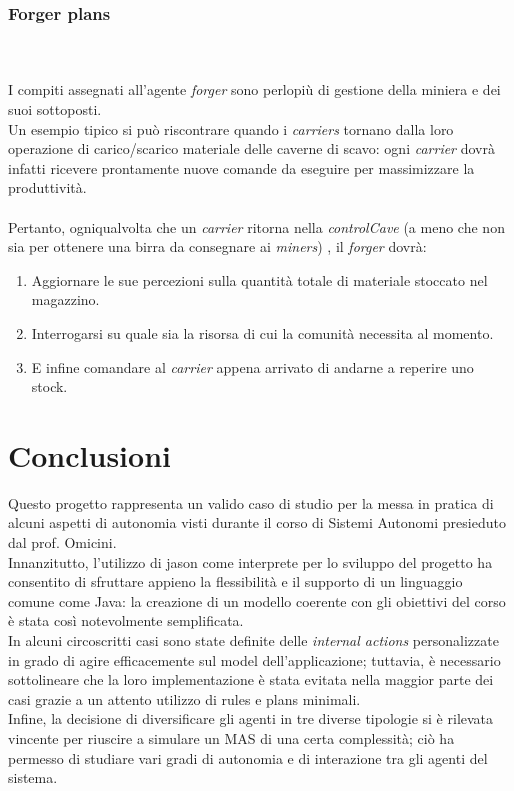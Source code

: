 \documentclass{llncs}
\begin{document}
\subsubsection{Forger plans}~\\\\
I compiti assegnati all'agente \textit{forger} sono perlopiù di gestione della miniera e dei suoi sottoposti.\\
Un esempio tipico si può riscontrare quando i \textit{carriers} tornano dalla loro operazione di carico/scarico materiale delle caverne di scavo: ogni \textit{carrier} dovrà infatti ricevere prontamente nuove comande da eseguire per massimizzare la produttività.\\\\
Pertanto, ogniqualvolta che un \textit{carrier} ritorna nella \textit{controlCave} (a meno che non sia per ottenere una birra da consegnare ai \textit{miners}) , il \textit{forger} dovrà:
\begin{enumerate}
	\item Aggiornare le sue percezioni sulla quantità totale di materiale stoccato nel magazzino.\\
	\item Interrogarsi su quale sia la risorsa di cui la comunità necessita al momento.\\
	\item E infine comandare al \textit{carrier} appena arrivato di andarne a reperire uno stock.
\end{enumerate}
\newpage
\section{Conclusioni}
Questo progetto rappresenta un valido caso di studio per la messa in pratica di alcuni aspetti di autonomia visti durante il corso di Sistemi Autonomi presieduto dal prof. Omicini.\\
Innanzitutto, l'utilizzo di jason come interprete per lo sviluppo del progetto ha consentito di sfruttare appieno la flessibilità e il supporto di un linguaggio comune come Java: la creazione di un modello coerente con gli obiettivi del corso è stata così notevolmente semplificata.\\
In alcuni circoscritti casi sono state definite delle \textit{internal actions} personalizzate in grado di agire efficacemente sul model dell'applicazione; tuttavia, è necessario sottolineare che la loro implementazione è stata evitata nella maggior parte dei casi grazie a un attento utilizzo di rules e plans minimali.\\
Infine, la decisione di diversificare gli agenti in tre diverse tipologie si è rilevata vincente per riuscire a simulare un MAS di una certa complessità; ciò ha permesso di studiare vari gradi di autonomia e di interazione tra gli agenti del sistema.
\end{document}
